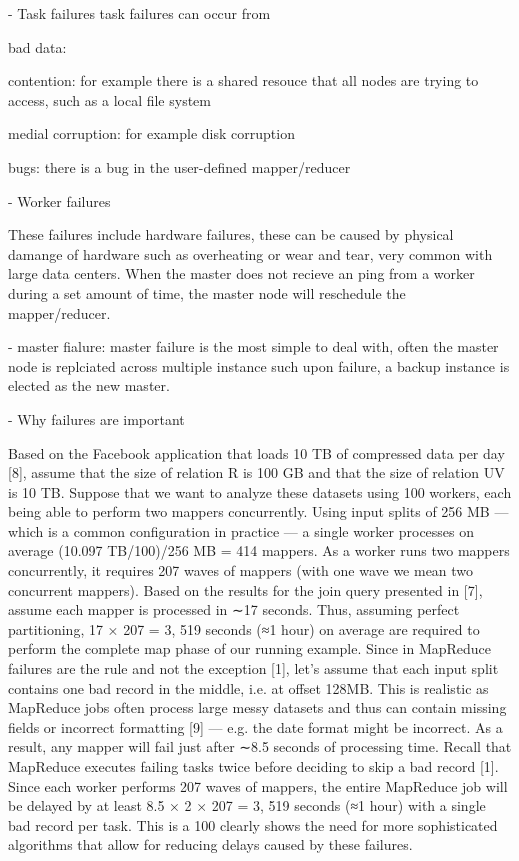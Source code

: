 \documentclass[10pt,twocolumn]{IEEEtran11}
\begin{document}
- Task failures
task failures can occur from

bad data:

contention:
    for example there is a shared resouce that all nodes are trying to access, such as a local file system

medial corruption:
    for example disk corruption
    
bugs:
    there is a bug in the user-defined mapper/reducer
    

- Worker failures

These failures include hardware failures, these can be caused by physical damange of hardware such as overheating or wear and tear, very common with large data centers. When the master does not recieve an ping from a worker during a set amount of time, the master node will reschedule the mapper/reducer.

- master fialure:
master failure is the most simple to deal with, often the master node is replciated across multiple instance such upon failure, a backup instance is elected as the new master.


- Why failures are important

Based on the Facebook
application that loads 10 TB of compressed data per day [8],
assume that the size of relation R is 100 GB and that the size
of relation UV is 10 TB. Suppose that we want to analyze these
datasets using 100 workers, each being able to perform two
mappers concurrently. Using input splits of 256 MB — which
is a common configuration in practice — a single worker processes
on average (10.097 TB/100)/256 MB = 414 mappers.
As a worker runs two mappers concurrently, it requires 207
waves of mappers (with one wave we mean two concurrent
mappers). Based on the results for the join query presented
in [7], assume each mapper is processed in ∼17 seconds. Thus,
assuming perfect partitioning, 17 × 207 = 3, 519 seconds (≈1
hour) on average are required to perform the complete map
phase of our running example.
Since in MapReduce failures are the rule and not the
exception [1], let’s assume that each input split contains one
bad record in the middle, i.e. at offset 128MB. This is realistic
as MapReduce jobs often process large messy datasets and
thus can contain missing fields or incorrect formatting [9] —
e.g. the date format might be incorrect. As a result, any mapper
will fail just after ∼8.5 seconds of processing time. Recall that
MapReduce executes failing tasks twice before deciding to
skip a bad record [1]. Since each worker performs 207 waves
of mappers, the entire MapReduce job will be delayed by at
least 8.5 × 2 × 207 = 3, 519 seconds (≈1 hour) with a single
bad record per task. This is a 100%
clearly shows the need for more sophisticated algorithms that
allow for reducing delays caused by these failures.
\end{document}
